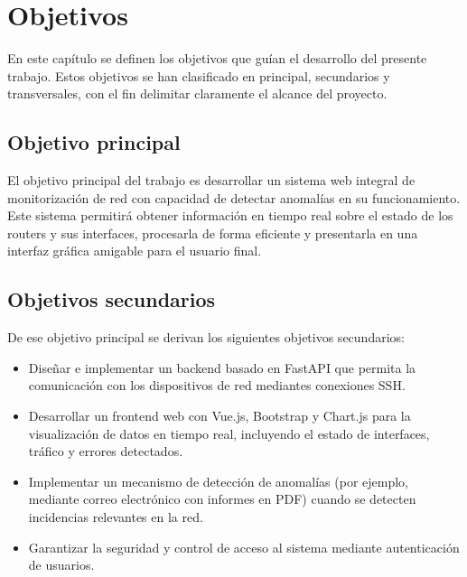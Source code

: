
\chapter{Objetivos}
\label{objetivos}

En este capítulo se definen los objetivos que guían el desarrollo del presente trabajo. Estos objetivos se han clasificado en principal, secundarios y transversales, con el fin delimitar claramente el alcance del proyecto.

\section{Objetivo principal}

El objetivo principal del trabajo es desarrollar un sistema web integral de monitorización de red con capacidad de detectar anomalías en su funcionamiento. Este sistema permitirá obtener información en tiempo real sobre el estado de los routers y sus interfaces, procesarla de forma eficiente y presentarla en una interfaz gráfica amigable para el usuario final.

\section{Objetivos secundarios}

De ese objetivo principal se derivan los siguientes objetivos secundarios:

\begin{itemize}
  \item Diseñar e implementar un backend basado en FastAPI que permita la comunicación con los dispositivos de red mediantes conexiones SSH.
  \item Desarrollar un frontend web con Vue.js, Bootstrap y Chart.js para la visualización de datos en tiempo real, incluyendo el estado de interfaces, tráfico y errores detectados.
  \item Implementar un mecanismo de detección de anomalías (por ejemplo, mediante correo electrónico con informes en PDF) cuando se detecten incidencias relevantes en la red.
  \item Garantizar la seguridad y control de acceso al sistema mediante autenticación de usuarios. 
\end{itemize}


